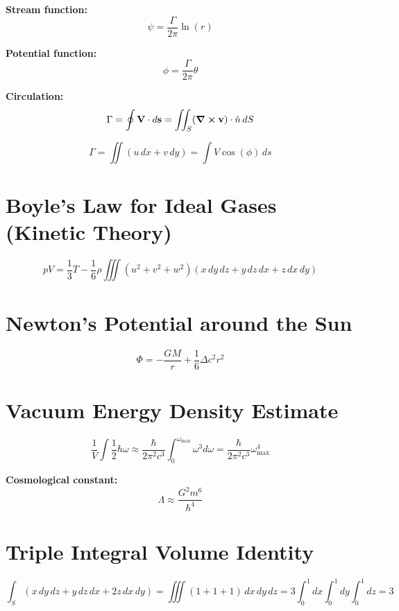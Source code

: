 \documentclass{article}
\begin{document}
    \textbf{Stream function:}
    \[
        \psi = \frac{\Gamma}{2\pi} \ln(r)
    \]

    \textbf{Potential function:}
    \[
        \phi = \frac{\Gamma}{2\pi} \theta
    \]

    \textbf{Circulation:}
    \[
        \Gamma = \oint \vb{V} \cdot d\vb{s} = \iint_S (\curl{\vb{v}}) \cdot \hat{n} \, dS
    \]

    \[
        \Gamma = \iint (u \, dx + v \, dy) = \int V \cos(\phi) \, ds
    \]

    \section*{Boyle's Law for Ideal Gases (Kinetic Theory)}

    \[
        pV = \frac{1}{3} T - \frac{1}{6} \rho \iiint (u^2 + v^2 + w^2) (x \, dy \, dz + y \, dz \, dx + z \, dx \, dy)
    \]

    \section*{Newton's Potential around the Sun}

    \[
        \Phi = - \frac{GM}{r} + \frac{1}{6} \Delta c^2 r^2
    \]

    \section*{Vacuum Energy Density Estimate}

    \[
        \frac{1}{V} \int \frac{1}{2} \hbar \omega \approx \frac{\hbar}{2\pi^2 c^3} \int_0^{\omega_{\text{max}}} \omega^3 d\omega
        = \frac{\hbar}{2\pi^2 c^3} \omega_{\text{max}}^4
    \]

    \textbf{Cosmological constant:}
    \[
        \Lambda \approx \frac{G^2 m^6}{\hbar^4}
    \]

    \section*{Triple Integral Volume Identity}

    \[
        \int_S (x\,dy\,dz + y\,dz\,dx + 2z\,dx\,dy)
        = \iiint (1+1+1) \, dx \, dy \, dz
        = 3 \int_0^1 dx \int_0^1 dy \int_0^1 dz = \boxed{3}
    \]
\end{document}
